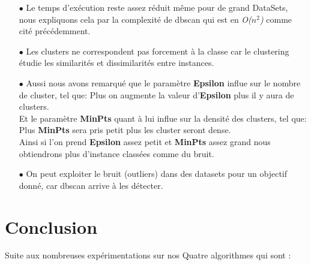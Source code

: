 \documentclass[12pt,a4paper,oneside]{book}
\begin{document}
\begin{itemize}
	\item[$\bullet$] Le temps d'exécution reste assez réduit même pour de grand DataSets, nous expliquons cela par la complexité de dbscan qui est en \textit{O($n^2$)} comme cité précédemment.
	
	\item[$\bullet$] Les clusters ne correspondent pas forcement à la classe car le clustering étudie les similarités et dissimilarités entre instances.
	
	\item[$\bullet$] Aussi nous avons remarqué que
	le paramètre \textbf{Epsilon} influe sur le nombre de cluster, tel que:  Plus on augmente la valeur d'\textbf{Epsilon} plus il y aura de clusters.\\
	
	Et le paramètre \textbf{MinPts} quant à lui influe sur la densité des clusters, tel que: Plus \textbf{MinPts} sera pris petit plus les cluster seront dense.\\
	
	Ainsi si l'on prend \textbf{Epsilon} assez petit et \textbf{MinPts} assez grand nous obtiendrons plus d'instance classées comme du bruit.\\
	
	
	\item[$\bullet$] On peut exploiter le bruit (outliers) dans des datasets pour un objectif donné, car dbscan arrive à les détecter.\\
\end{itemize}



















\chapter*{Conclusion}

Suite aux nombreuses expérimentations sur nos  Quatre algorithmes  qui sont :\\
\end{document}
